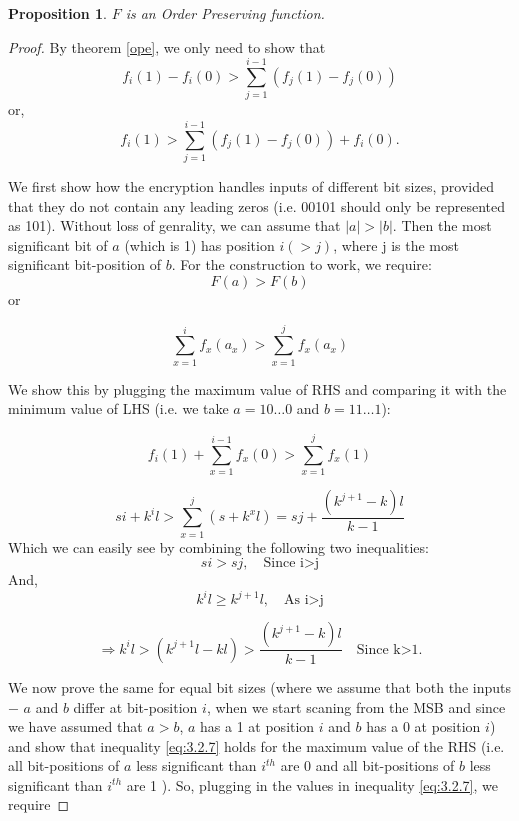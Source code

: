 \documentclass[11pt, letterpaper, romanappendices, onecolumn]{article}
\theoremstyle{plain}\newtheorem{thm}{Theorem}[section]
\newtheorem{prop}[thm]{Proposition}
\theoremstyle{definition}
\theoremstyle{remark}
\begin{document}
\begin{prop}
$F$ is an Order Preserving function.
\end{prop}

\begin{proof}

\par By theorem \ref{ope}, we only need to show that
\[
	f_i(1)- f_i(0) > \sum\limits^{i-1}_{j=1}(f_j(1)-f_j(0))
\]
or,
\begin{equation}
	f_i(1) > \sum\limits^{i-1}_{j=1}(f_j(1)-f_j(0)) + f_i(0). \label{eq:3.2.7}
\end{equation}

\par We first show how the encryption handles inputs of different bit sizes, provided that they do not contain any leading zeros (i.e. 00101 should only be represented as 101). Without loss of genrality, we can assume that $|a| > |b|$. Then the most significant bit of $a$ (which is 1) has position $i (> j)$, where j is the most significant bit-position of $b$. For the construction to work, we require:
\[
	F(a)>F(b)
\] 
or

\[
	\sum\limits^i_{x=1}f_x(a_x)>\sum\limits^j_{x=1}f_x(a_x)
\] 

\par We show this by plugging the maximum value of RHS and comparing it with the minimum value of LHS (i.e. we take $a=10 \ldots 0$ and $b=11\ldots 1$):

\[
	f_i(1)+\sum\limits^{i-1}_{x=1}f_x(0)>\sum\limits^j_{x=1}f_x(1)
\] 
 
\[
	si + k^il>\sum\limits^j_{x=1}(s+k^xl)= sj + \frac{(k^{j+1}-k)l}{k-1}
\] 
Which we can easily see by combining the following two inequalities:
\[
	si>sj, \quad\text{Since i>j}
\]
And,
\[
	k^il \geq k^{j+1}l, \quad\text{As i>j}
\]

\[
	\Longrightarrow k^il>(k^{j+1}l-kl)>\frac{(k^{j+1}-k)l}{k-1} \quad\text{Since k>1}. 
\]

\par We now prove the same for equal bit sizes (where we assume that both the inputs $-$ $a$ and $b$ differ at bit-position $i$, when we start scaning from the MSB and since we have assumed that $a>b$, $a$ has a 1 at position $i$ and $b$ has a 0 at position $i$) and show that inequality \eqref{eq:3.2.7} holds for the maximum value of the RHS (i.e. all bit-positions of $a$ less significant than $i^{th}$ are 0 and all bit-positions of $b$ less significant than $i^{th}$ are 1 ). So, plugging in the values in inequality \eqref{eq:3.2.7}, we require


\end{proof}
\end{document}
